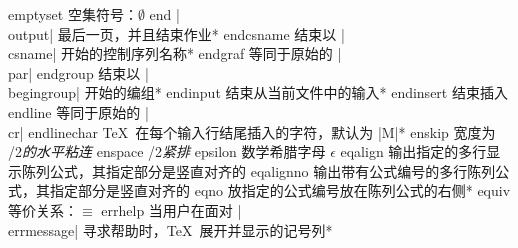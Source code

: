 \capcs emptyset {空集符号：$\emptyset$}{}{}
\capcs end {|\\output| 最后一页，并且结束作业}*{}
\capcs endcsname {结束以 |\\csname| 开始的控制序列名称}*{}
\capcs endgraf {等同于原始的 |\\par|}{}{}
\capcs endgroup {结束以 |\\begingroup| 开始的编组}*{}
\capcs endinput {结束从当前文件中的输入}*{}
\capcs endinsert {结束插入}{}{}
\capcs endline {等同于原始的 |\\cr|}{}{}
\capcs endlinechar {\TeX\ 在每个输入行结尾插入的字符，默认为 |\twocarets M|}*{}
\capcs enskip {宽度为 /2\em 的水平粘连}{}{}
\capcs enspace {/2\em 紧排}{}{}
\capcs epsilon {数学希腊字母 $\epsilon$}{}{}
\capcs eqalign {输出指定的多行显示陈列公式，其指定部分是竖直对齐的}{}{}
\capcs eqalignno {输出带有公式编号的多行陈列公式，其指定部分是竖直对齐的}{}{}
\capcs eqno {放指定的公式编号放在陈列公式的右侧}*{}
\capcs equiv {等价关系：$\equiv$}{}{}
\capcs errhelp {当用户在面对 |\\errmessage| 寻求帮助时，\TeX\ 展开并显示的记号列}*{}
